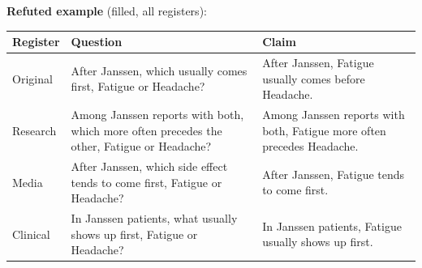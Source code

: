 \documentclass[11pt]{article}
\begin{document}
\vspace{3pt}
\textbf{Refuted example} (filled, all registers): \\
\begin{tabularx}{\linewidth}{@{}l L L@{}}
\toprule
\textbf{Register} & \textbf{Question} & \textbf{Claim} \\
\midrule
Original & After Janssen, which usually comes first, Fatigue or Headache? & After Janssen, Fatigue usually comes before Headache. \\
Research & Among Janssen reports with both, which more often precedes the other, Fatigue or Headache? & Among Janssen reports with both, Fatigue more often precedes Headache. \\
Media & After Janssen, which side effect tends to come first, Fatigue or Headache? & After Janssen, Fatigue tends to come first. \\
Clinical & In Janssen patients, what usually shows up first, Fatigue or Headache? & In Janssen patients, Fatigue usually shows up first. \\
\bottomrule
\end{tabularx}
\vspace{3pt}
\end{document}
